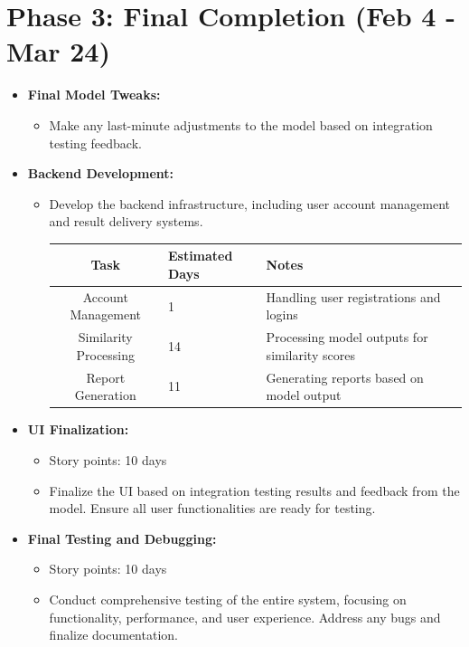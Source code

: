 \documentclass[12pt]{article}
\begin{document}
\section*{Phase 3: Final Completion (Feb 4 - Mar 24)}
\begin{itemize}
    \item \textbf{Final Model Tweaks:}
    \begin{itemize}
        \item Make any last-minute adjustments to the model based on integration testing feedback.
    \end{itemize}

    \item \textbf{Backend Development:}
    \begin{itemize}
        \item Develop the backend infrastructure, including user account management and result delivery systems.

        \begin{tabular}{|c|p{4cm}|p{4cm}|p{4cm}|}
            \hline
            \textbf{Task} & \textbf{Estimated Days} & \textbf{Notes} \\
            \hline
            Account Management & 1 & Handling user registrations and logins \\
            \hline
            Similarity Processing & 14 &  Processing model outputs for similarity scores \\
            \hline
            Report Generation & 11 & Generating reports based on model output \\
            \hline
        \end{tabular}
    \end{itemize}

    \item \textbf{UI Finalization:}
    \begin{itemize}
        \item Story points: 10 days
        \item Finalize the UI based on integration testing results and feedback from the model. Ensure all user functionalities are ready for testing.
    \end{itemize}

    \item \textbf{Final Testing and Debugging:}
    \begin{itemize}
        \item Story points: 10 days
        \item Conduct comprehensive testing of the entire system, focusing on functionality, performance, and user experience. Address any bugs and finalize documentation.
    \end{itemize}
\end{itemize}
\end{document}
